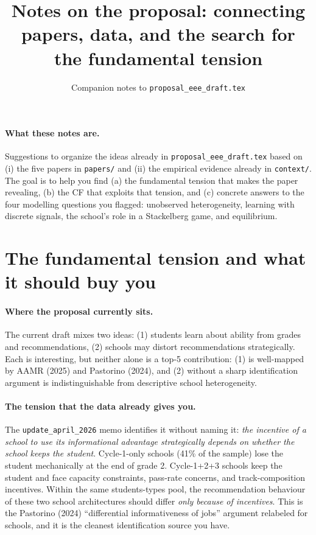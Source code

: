 \documentclass{article}
\title{Notes on the proposal: connecting papers, data, and the search for the
fundamental tension}
\author{Companion notes to \texttt{proposal\_eee\_draft.tex}}
\date{}
\begin{document}
\maketitle

\paragraph{What these notes are.}  Suggestions to organize the ideas already in
\texttt{proposal\_eee\_draft.tex} based on (i) the five papers in
\texttt{papers/} and (ii) the empirical evidence already in
\texttt{context/}. The goal is to help you find (a) the fundamental tension
that makes the paper revealing, (b) the CF that exploits that tension, and (c)
concrete answers to the four modelling questions you flagged: unobserved
heterogeneity, learning with discrete signals, the school's role in a
Stackelberg game, and equilibrium.

\section{The fundamental tension and what it should buy you}

\paragraph{Where the proposal currently sits.}  The current draft mixes two
ideas: (1) students learn about ability from grades and recommendations, (2)
schools may distort recommendations strategically. Each is interesting, but
neither alone is a top-5 contribution: (1) is well-mapped by AAMR (2025) and
Pastorino (2024), and (2) without a sharp identification argument is
indistinguishable from descriptive school heterogeneity.

\paragraph{The tension that the data already gives you.}  The
\texttt{update\_april\_2026} memo identifies it without naming it: \emph{the
incentive of a school to use its informational advantage strategically depends
on whether the school keeps the student}. Cycle-1-only schools (41\% of the
sample) lose the student mechanically at the end of grade 2. Cycle-1+2+3
schools keep the student and face capacity constraints, pass-rate concerns,
and track-composition incentives. Within the same students-types pool, the
recommendation behaviour of these two school architectures should differ
\emph{only because of incentives}. This is the Pastorino (2024) ``differential
informativeness of jobs'' argument relabeled for schools, and it is the cleanest
identification source you have.
\end{document}
